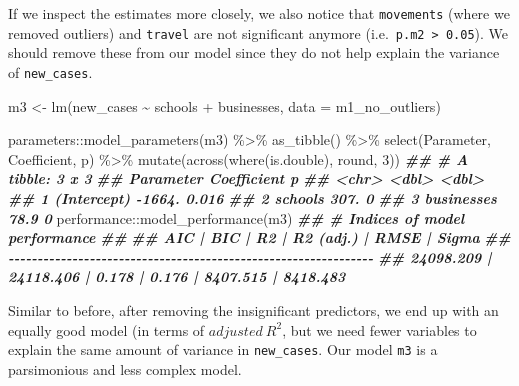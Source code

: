 \documentclass[
]{book}
\newenvironment{Shaded}{\begin{snugshade}}{\end{snugshade}}
\newcommand{\AttributeTok}[1]{\textcolor[rgb]{0.77,0.63,0.00}{#1}}
\newcommand{\DecValTok}[1]{\textcolor[rgb]{0.00,0.00,0.81}{#1}}
\newcommand{\DocumentationTok}[1]{\textcolor[rgb]{0.56,0.35,0.01}{\textbf{\textit{#1}}}}
\newcommand{\FunctionTok}[1]{\textcolor[rgb]{0.00,0.00,0.00}{#1}}
\newcommand{\NormalTok}[1]{#1}
\newcommand{\OtherTok}[1]{\textcolor[rgb]{0.56,0.35,0.01}{#1}}
\newcommand{\SpecialCharTok}[1]{\textcolor[rgb]{0.00,0.00,0.00}{#1}}
\begin{document}
If we inspect the estimates more closely, we also notice that \texttt{movements} (where we removed outliers) and \texttt{travel} are not significant anymore (i.e.~\texttt{p.m2\ \textgreater{}\ 0.05}). We should remove these from our model since they do not help explain the variance of \texttt{new\_cases}.

\begin{Shaded}
\begin{Highlighting}[]
\NormalTok{m3 }\OtherTok{\textless{}{-}} \FunctionTok{lm}\NormalTok{(new\_cases }\SpecialCharTok{\textasciitilde{}}\NormalTok{ schools }\SpecialCharTok{+}\NormalTok{ businesses,}
         \AttributeTok{data =}\NormalTok{ m1\_no\_outliers)}

\NormalTok{parameters}\SpecialCharTok{::}\FunctionTok{model\_parameters}\NormalTok{(m3) }\SpecialCharTok{\%\textgreater{}\%}
  \FunctionTok{as\_tibble}\NormalTok{() }\SpecialCharTok{\%\textgreater{}\%}
  \FunctionTok{select}\NormalTok{(Parameter, Coefficient, p) }\SpecialCharTok{\%\textgreater{}\%}
  \FunctionTok{mutate}\NormalTok{(}\FunctionTok{across}\NormalTok{(}\FunctionTok{where}\NormalTok{(is.double), round, }\DecValTok{3}\NormalTok{))}
\DocumentationTok{\#\# \# A tibble: 3 x 3}
\DocumentationTok{\#\#   Parameter   Coefficient     p}
\DocumentationTok{\#\#   \textless{}chr\textgreater{}             \textless{}dbl\textgreater{} \textless{}dbl\textgreater{}}
\DocumentationTok{\#\# 1 (Intercept)     {-}1664.  0.016}
\DocumentationTok{\#\# 2 schools           307.  0    }
\DocumentationTok{\#\# 3 businesses         78.9 0}
\NormalTok{performance}\SpecialCharTok{::}\FunctionTok{model\_performance}\NormalTok{(m3)}
\DocumentationTok{\#\# \# Indices of model performance}
\DocumentationTok{\#\# }
\DocumentationTok{\#\# AIC       |       BIC |    R2 | R2 (adj.) |     RMSE |    Sigma}
\DocumentationTok{\#\# {-}{-}{-}{-}{-}{-}{-}{-}{-}{-}{-}{-}{-}{-}{-}{-}{-}{-}{-}{-}{-}{-}{-}{-}{-}{-}{-}{-}{-}{-}{-}{-}{-}{-}{-}{-}{-}{-}{-}{-}{-}{-}{-}{-}{-}{-}{-}{-}{-}{-}{-}{-}{-}{-}{-}{-}{-}{-}{-}{-}{-}{-}{-}}
\DocumentationTok{\#\# 24098.209 | 24118.406 | 0.178 |     0.176 | 8407.515 | 8418.483}
\end{Highlighting}
\end{Shaded}

Similar to before, after removing the insignificant predictors, we end up with an equally good model (in terms of \(adjusted\ R^2\), but we need fewer variables to explain the same amount of variance in \texttt{new\_cases}. Our model \texttt{m3} is a parsimonious and less complex model.
\end{document}
